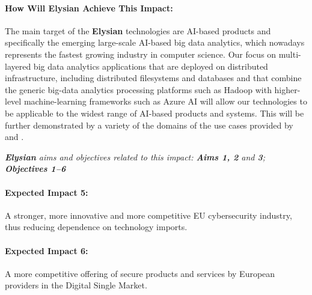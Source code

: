 \documentclass[a4paper,11pt]{article}
\newcommand{\project}[1]{\textbf{#1}\xspace}
\newcommand{\SECURITY}{\project{Elysian}}
\newcommand{\TheProject}{\SECURITY}
\begin{document}
\begin{mdframed}[backgroundcolor=gray!10]
\paragraph{How Will \TheProject{} Achieve This Impact:}
The main target of the \TheProject{} technologies are AI-based products and specifically the emerging large-scale AI-based big data analytics, which nowadays represents the fastest growing industry in computer science. Our focus on multi-layered big data analytics applications that are deployed on distributed infrastructure, including distributed filesystems and databases and that combine the generic big-data analytics processing platforms such as Hadoop with higher-level machine-learning frameworks such as Azure AI will allow our technologies to be applicable to the widest range of AI-based products and systems. This will be further demonstrated by a variety of the domains of the use cases provided by \SOPRAshort{} and \FRQshort{}. 

\emph{\TheProject{} aims and objectives related to this impact: \textbf{Aims 1, 2} and \textbf{3}; \textbf{Objectives 1--6}}
\end{mdframed}

\begin{mdframed}[backgroundcolor=blue!5]
\paragraph{Expected Impact 5:}
A stronger, more innovative and more competitive EU cybersecurity industry, thus reducing dependence on technology imports.

\paragraph{Expected Impact 6:}
A more competitive offering of secure products and services by European providers in the Digital Single Market.
\end{mdframed}
\end{document}
